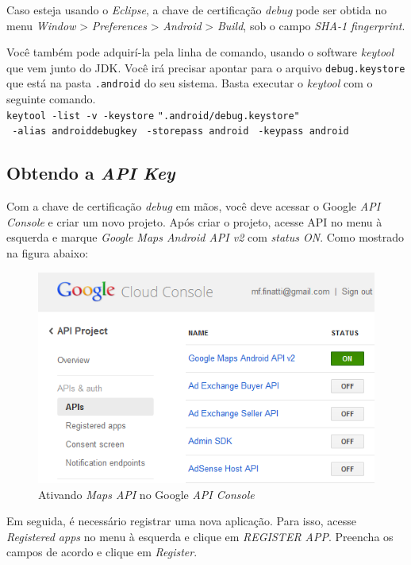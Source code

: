\documentclass[a4paper,12pt,brazil,oneside]{book}
\begin{document}
	 	Caso esteja usando o \emph{Eclipse}, a chave de certificação \emph{debug} pode ser obtida no menu \emph{Window} > \emph{Preferences} > \emph{Android}  > \emph{Build}, sob o campo \emph{SHA-1 fingerprint}.

		Você também pode adquirí-la pela linha de comando, usando o software \emph{keytool} que vem junto do JDK. Você irá precisar apontar para o arquivo \texttt{debug.keystore} que está na pasta \texttt{.android} do seu sistema. Basta executar o \emph{keytool} com o seguinte comando. \\

		\texttt{keytool -list -v -keystore} \texttt{".android/debug.keystore"} \\ \texttt{ -alias androiddebugkey} \texttt{ -storepass android} \texttt{ -keypass android}

		\subsection{Obtendo a \emph{API Key}}

		Com a chave de certificação \emph{debug} em mãos, você deve acessar o Google \emph{API Console} e criar um novo projeto. Após criar o projeto, acesse API no menu à esquerda e marque \emph{Google Maps Android API v2} com \emph{status ON}. Como mostrado na figura abaixo:

		\begin{figure}[H]
		  \centering
		  \includegraphics{figuras/api/localizacao/console1.png}
		  \caption{Ativando \emph{Maps API} no Google \emph{API Console}}
		  \label{fig:apiconsole1}
		\end{figure}

		Em seguida, é necessário registrar uma nova aplicação. Para isso, acesse \emph{Registered apps} no menu à esquerda e clique em \emph{REGISTER APP}. Preencha os campos de acordo e clique em \emph{Register}.
\end{document}
